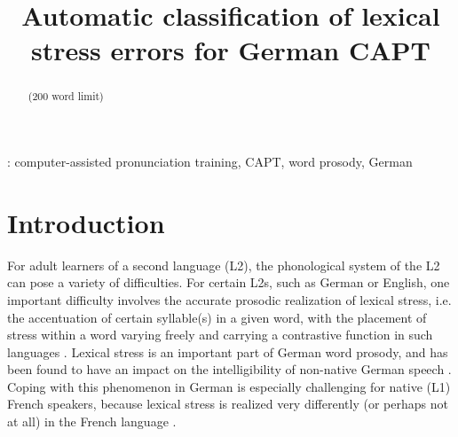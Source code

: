 \documentclass[a4paper]{article}
\title{Automatic classification of lexical stress errors for German CAPT}
\begin{document}
  \maketitle
  \begin{abstract}
  
    (200 word limit) 
  
    
    
    
  \end{abstract}
  : computer-assisted pronunciation training, CAPT, word prosody, German


  \section{Introduction}
  
  
    
  
  
  For adult learners of a second language (L2), the phonological system of the L2 can pose a variety of difficulties. For certain L2s, such as German or English, one important difficulty involves the accurate prosodic realization of lexical stress, i.e. the accentuation of certain syllable(s) in a given word, with the placement of stress within a word varying freely and carrying a contrastive function in such languages \cite{Cutler2005}. Lexical stress is an important part of German word prosody, and has been found to have an impact on the intelligibility of non-native German speech \cite{Hirschfeld1994}. Coping with this phenomenon in German is especially challenging for native (L1) French speakers, because lexical stress is realized very differently (or perhaps not at all) in the French language \cite{Dupoux2008,Michaux2013}.
  
\end{document}
